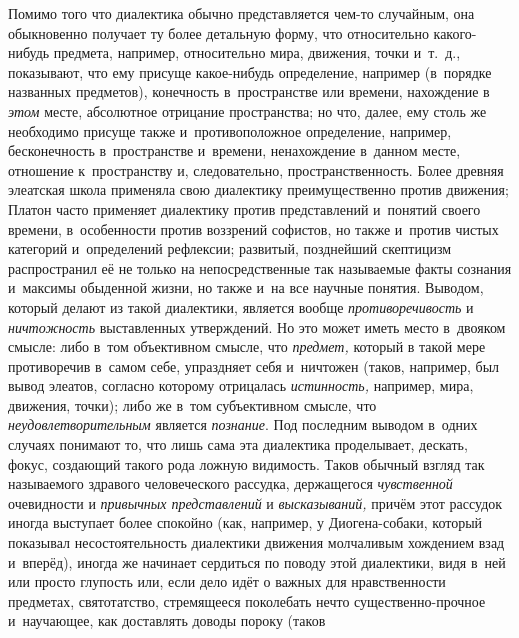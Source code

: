 Помимо того что диалектика обычно представляется чем-то
случайным, она обыкновенно получает ту более детальную форму, что
относительно какого-нибудь предмета, например, относительно мира, движения,
точки и~т.~д., показывают, что ему присуще какое-нибудь определение,
например (в~порядке названных предметов), конечность в~пространстве или
времени, нахождение в {\em этом}
месте, абсолютное отрицание пространства; но что, далее, ему
столь же необходимо присуще также и~противоположное определение, например,
бесконечность в~пространстве и~времени, ненахождение в~данном месте,
отношение к~пространству и, следовательно, пространственность. Более
древняя элеатская школа применяла свою диалектику преимущественно против
движения; Платон часто применяет диалектику против представлений и~понятий
своего времени, в~особенности против воззрений софистов, но также и~против
чистых категорий и~определений рефлексии; развитый, позднейший скептицизм
распространил её не только на непосредственные так называемые факты
сознания и~максимы обыденной жизни, но также и~на все научные понятия.
Выводом, который делают из такой диалектики, является вообще
{\em противоречивость} и {\em ничтожность}
выставленных утверждений. Но это может иметь место в~двояком
смысле: либо в~том объективном смысле, что {\em предмет,} который в
такой мере противоречив в~самом себе, упраздняет себя и~ничтожен (таков,
например, был вывод элеатов, согласно которому отрицалась {\em истинность,}
например, мира, движения, точки); либо же в~том субъективном
смысле, что {\em неудовлетворительным} является {\em познание}.
Под последним выводом в~одних случаях понимают то, что лишь
сама эта диалектика проделывает, дескать, фокус, создающий такого рода
ложную видимость. Таков обычный взгляд так называемого здравого
человеческого рассудка, держащегося {\em чувственной} очевидности и
{\em привычных представлений} и {\em высказываний,}
причём этот рассудок иногда выступает более спокойно (как, например, у
Диогена-собаки,
который показывал несостоятельность диалектики движения
молчаливым хождением взад и~вперёд), иногда же начинает сердиться по поводу
этой диалектики, видя в~ней или просто глупость или, если дело идёт о
важных для нравственности предметах, святотатство, стремящееся поколебать
нечто существенно-прочное и~научающее, как доставлять доводы пороку (таков

